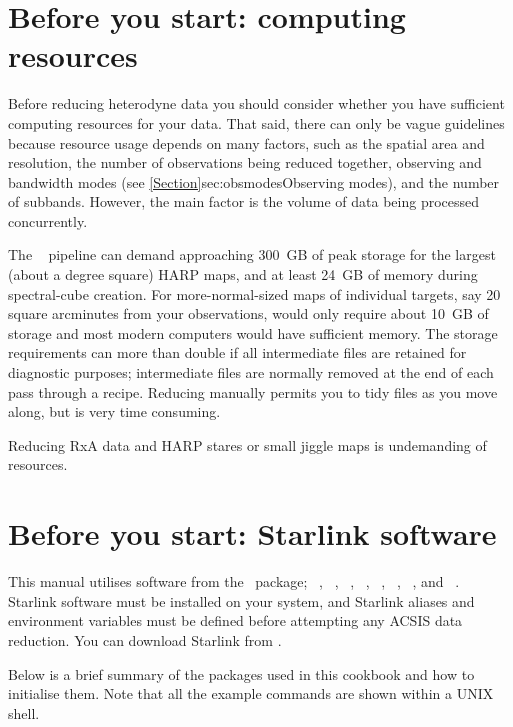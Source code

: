 \documentclass[11pt,oneside,chapters]{starlink}
\begin{document}
\section{ Before you start: computing resources}
\label{sec:computing}

Before reducing heterodyne data you should consider whether you have
sufficient computing resources for your data.  That said, there can
only be vague guidelines because resource usage depends on many
factors, such as the spatial area and resolution, the number of
observations being reduced together, observing and bandwidth modes
(see \cref{Section}{sec:obsmodes}{Observing modes}), and the number of
subbands.  However, the main factor is the volume of data being
processed concurrently.

The \oracdr\ \cite{oracdr,oracdr_infra} pipeline can demand approaching
300~GB of peak storage for the largest (about a degree square) HARP maps,
and at least 24~GB of memory during spectral-cube creation.  For
more-normal-sized maps of individual targets, say 20 square arcminutes
from your observations, would only require about 10~GB of storage and
most modern computers would have sufficient memory.  The storage
requirements can more than double if all intermediate files are
retained for diagnostic purposes; intermediate files are normally
removed at the end of each pass through a recipe.  Reducing manually
permits you to tidy files as you move along, but is very time consuming.

Reducing RxA data and HARP stares or small jiggle maps is
undemanding of resources.

\section{Before you start: Starlink software}

This manual utilises software from the \starlink\ package; \smurf\
\cite{smurf}, \Kappa\ \cite{kappa}, \gaia\ \cite{gaia}, \oracdr\
\cite{oracdr}, \convert\ \cite{convert}, \cupid\ \cite{cupid},
\ccdpack\ \cite{ccdpack}, and
\picard\ \cite{picard}. Starlink software must be installed on your
system, and Starlink aliases and environment variables must be defined
before attempting any ACSIS data reduction. You can download Starlink
from  .

Below is a brief summary of the packages used in this cookbook and how
to initialise them. Note that all the example commands are shown within
a UNIX shell.
\end{document}
